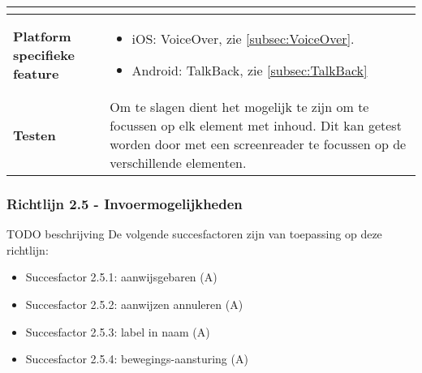 \begin{table}[H]
\begin{tabular}{|l|p{12cm}|}
\begin{itemize}
        \end{itemize}                                                                                                                                                                                                                                                                                                                                                                                                                    \\ 
        \hline
        \textbf{Platform specifieke feature} & \begin{itemize}
            \item iOS: VoiceOver, zie \ref{subsec:VoiceOver}.
            \item Android: TalkBack, zie \ref{subsec:TalkBack}
        \end{itemize}                                                                                                                                                                       \\ 
        \hline
        \textbf{Testen}                       & Om te slagen dient het mogelijk te zijn om te focussen op elk element met inhoud. Dit kan getest worden door met een screenreader te focussen op de verschillende elementen.                                                                                                                                                                                          \\
        \hline
    \end{tabular}
    
\end{table}

\subsubsection{Richtlijn 2.5 - Invoermogelijkheden}
TODO beschrijving
De volgende succesfactoren zijn van toepassing op deze richtlijn: 
\begin{itemize}
    \item Succesfactor 2.5.1: aanwijsgebaren (A)
     \item Succesfactor 2.5.2: aanwijzen annuleren (A)
     \item Succesfactor 2.5.3: label in naam (A)
          \item Succesfactor 2.5.4: bewegings-aansturing (A)
\end{itemize}

